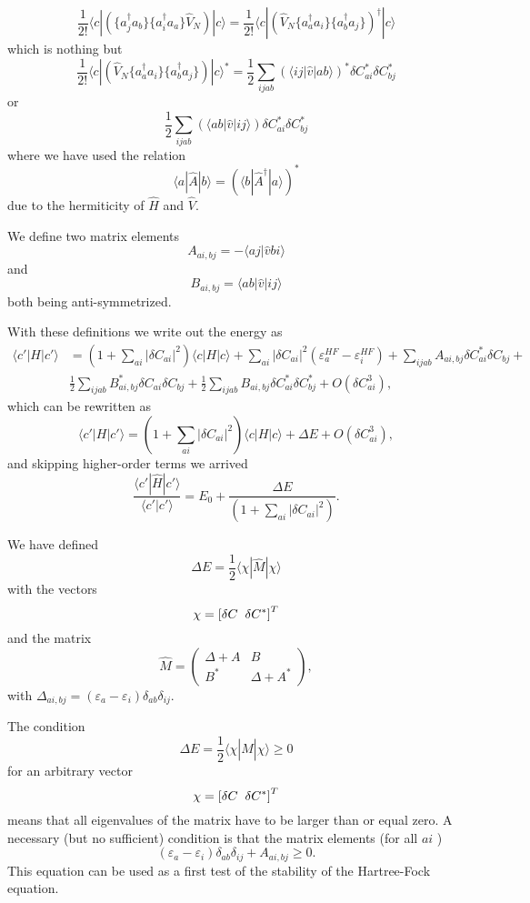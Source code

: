 \documentclass[graybox,sectrefs,envcountresetchap,open=right]{svmonodo}
\begin{document}
\[
\frac{1}{2!}\langle c |\left(\{a^\dagger_j a_b\} \{a^\dagger_i a_a\} \hat{V}_N  \right) | c\rangle  = 
\frac{1}{2!}\langle c |\left( \hat{V}_N \{a^\dagger_a a_i\} \{a^\dagger_b a_j\} \right)^{\dagger} | c\rangle 
\]
which is nothing but
\[
\frac{1}{2!}\langle c |  \left( \hat{V}_N \{a^\dagger_a a_i\} \{a^\dagger_b a_j\} \right) | c\rangle^*
=\frac{1}{2} \sum_{ijab} (\langle ij|\hat{v}|ab\rangle)^*\delta C_{ai}^*\delta C_{bj}^*
\]
or 
\[
\frac{1}{2} \sum_{ijab} (\langle ab|\hat{v}|ij\rangle)\delta C_{ai}^*\delta C_{bj}^*
\]
where we have used the relation
\[ 
\langle a |\hat{A} | b\rangle =  (\langle b |\hat{A}^{\dagger} | a\rangle)^*
\]
due to the hermiticity of $\hat{H}$ and $\hat{V}$.


We define two matrix elements
\[
A_{ai,bj}=-\langle aj|\hat{v} bi\rangle
\]
and
\[
B_{ai,bj}=\langle ab|\hat{v}|ij\rangle
\]
both being anti-symmetrized.



With these definitions we write out the energy as
\begin{align}
\langle c'|H|c'\rangle& = \left(1+\sum_{ai}|\delta C_{ai}|^2\right)\langle c |H|c\rangle+\sum_{ai}|\delta C_{ai}|^2(\varepsilon_a^{HF}-\varepsilon_i^{HF})+\sum_{ijab}A_{ai,bj}\delta C_{ai}^*\delta C_{bj}+\\
&\frac{1}{2} \sum_{ijab} B_{ai,bj}^*\delta C_{ai}\delta C_{bj}+\frac{1}{2} \sum_{ijab} B_{ai,bj}\delta C_{ai}^*\delta C_{bj}^*
+O(\delta C_{ai}^3),
\end{align}
which can be rewritten as
\[
\langle c'|H|c'\rangle = \left(1+\sum_{ai}|\delta C_{ai}|^2\right)\langle c |H|c\rangle+\Delta E+O(\delta C_{ai}^3),
\]
and skipping higher-order terms we arrived
\[
\frac{\langle c' |\hat{H} | c'\rangle}{\langle c' |c'\rangle} =E_0+\frac{\Delta E}{\left(1+\sum_{ai}|\delta C_{ai}|^2\right)}.
\]



We have defined 
\[
\Delta E = \frac{1}{2} \langle \chi | \hat{M}| \chi \rangle
\]
with the vectors 
\[ 
\chi = \left[ \delta C\hspace{0.2cm} \delta C^*\right]^T
\]
and the matrix 
\[
\hat{M}=\left(\begin{array}{cc} \Delta + A & B \\ B^* & \Delta + A^*\end{array}\right),
\]
with $\Delta_{ai,bj} = (\varepsilon_a-\varepsilon_i)\delta_{ab}\delta_{ij}$.



The condition
\[
\Delta E = \frac{1}{2} \langle \chi | \hat{M}| \chi \rangle \ge 0
\]
for an arbitrary  vector 
\[ 
\chi = \left[ \delta C\hspace{0.2cm} \delta C^*\right]^T
\]
means that all eigenvalues of the matrix have to be larger than or equal zero. 
A necessary (but no sufficient) condition is that the matrix elements (for all $ai$ )
\[
(\varepsilon_a-\varepsilon_i)\delta_{ab}\delta_{ij}+A_{ai,bj} \ge 0.
\]
This equation can be used as a first test of the stability of the Hartree-Fock equation.
\end{document}
